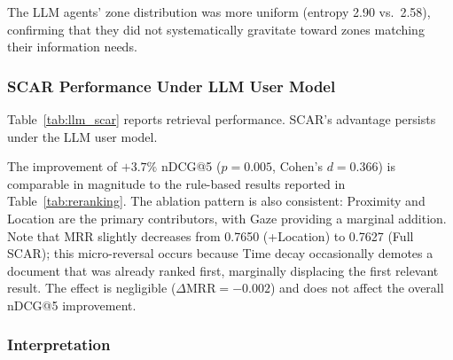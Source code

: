 \documentclass[journal]{IEEEtran}
\begin{document}
The LLM agents' zone distribution was more uniform (entropy 2.90 vs.\ 2.58), confirming that they did not systematically gravitate toward zones matching their information needs.

\subsubsection{SCAR Performance Under LLM User Model}

Table~\ref{tab:llm_scar} reports retrieval performance. SCAR's advantage persists under the LLM user model.

\begin{table}[htbp]
\centering
\caption{SCAR re-ranking under LLM-based user simulation (50~agents, 7~days). The improvement remains statistically significant ($p = 0.005$).}
\label{tab:llm_scar}
\end{table}

The improvement of $+3.7\%$ nDCG@5 ($p = 0.005$, Cohen's $d = 0.366$) is comparable in magnitude to the rule-based results reported in Table~\ref{tab:reranking}. The ablation pattern is also consistent: Proximity and Location are the primary contributors, with Gaze providing a marginal addition.  Note that MRR slightly decreases from 0.7650 (+Location) to 0.7627 (Full SCAR); this micro-reversal occurs because Time decay occasionally demotes a document that was already ranked first, marginally displacing the first relevant result.  The effect is negligible ($\Delta\text{MRR} = -0.002$) and does not affect the overall nDCG@5 improvement.

\subsubsection{Interpretation}
\end{document}
